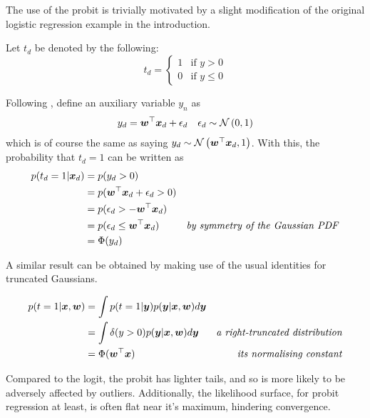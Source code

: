 The use of the probit is trivially motivated by a slight modification of the original logistic regression example in the introduction.

Let $t_d$ be denoted by the following:
\begin{equation}
    t_d = \left\{ \begin{matrix}
        1 & \text{if } y > 0 \\
        0 & \text{if } y \leq 0
    \end{matrix} \right.
\end{equation}


Following \cite{AlbertChib1993}, define an auxiliary variable $y_n$ as
\begin{align}
y_d & = \bm w^\top \bm x_d + \epsilon_d & \epsilon_d \sim \mathcal{N} \left( {0}, {1} \right)
\end{align}
which is of course the same as saying $y_d \sim \mathcal{N} \left( {\bm w^\top\bm x_d}, {1} \right)$. With this, the probability that $t_d = 1$ can be written as
\begin{equation}
\begin{aligned}
p(t_d = 1 | \bm x_d) & = p (y_d > 0) \\
& = p(\bm w^\top\bm x_d + \epsilon_d > 0) \\
& = p(\epsilon_d > - \bm w^\top\bm x_d) \\
& = p(\epsilon_d \leq \bm w^\top\bm x_d) & \text{\emph{by symmetry of the Gaussian PDF}} \\
& = \Phi(y_d) 
\end{aligned}
\end{equation}

A similar result can be obtained by making use of the usual identities for truncated Gaussians.

\begin{equation}
\begin{aligned}
p(t = 1 | \bm x, \bm w) & = \int p(t = 1 | \bm y) p(\bm y | \bm x, \bm w) d\bm y \\
 & = \int \delta(y > 0) p(\bm y | \bm x, \bm w) d\bm y & \text{\emph{a right-truncated distribution}} \\
 & = \Phi(\bm w^\top\bm x) & \text{\emph{its normalising constant}}
\end{aligned}
\end{equation}

Compared to the logit, the probit has lighter tails, and so is more likely to be adversely affected by outliers. Additionally, the likelihood surface, for probit regression at least, is often flat near it's maximum, hindering convergence\cite{Dow2004}.


